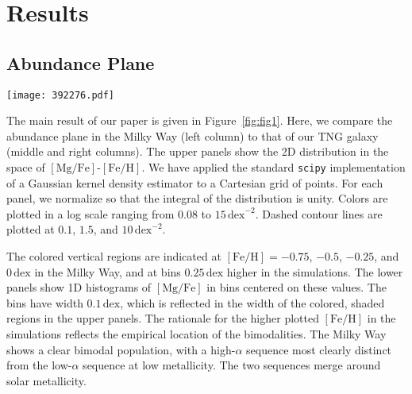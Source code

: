\documentclass[twocolumn]{aastex631}
\newcommand{\Gyr}{\ensuremath{\textrm{Gyr}}}
\newcommand{\FeH}{\ensuremath{[\textrm{Fe}/\textrm{H}]}}
\newcommand{\MgFe}{\ensuremath{[\textrm{Mg}/\textrm{Fe}]}}
\newcommand{\dex}{\ensuremath{\textrm{dex}}}
\begin{document}
\section{Results}\label{sec:results}
\subsection{Abundance Plane}\label{ssec:plane}

\begin{figure*}
  \centering
  \texttt{[image: 392276.pdf]}
  \caption{\textbf{When old stars are $\alpha$-enhanced, our galaxy from TNG displays a prominent bimodality.} The upper left panel shows the distribution in the \MgFe{}-\FeH{} plane of the Milky Way, demonstrating a clear bimodality (data selection given in text). The lower left panel shows the 1D histograms of \MgFe{} at fixed \FeH{} values of $-0.5$, $-0.25$, $0$, and $0.25$ (blue, orange, green, and red, respectively). In the Milky Way, the bimodality is strongest at low metallicities while disappearing at high metallicities. The middle column shows the same plots but for our TNG galaxy (392276) and with the fixed \FeH{} values $0.25\,\dex$ lower. Only faint structure is seen in the lowest bin (blue, $-0.75\,\dex$). The right column shows the same subhalo but after increasing the \MgFe{} value of star particles formed before $z=1.5$ linearly with formation time (with a slope of $0.1\dex/\Gyr$). A clear bimodality is shown in these panels which, unlike in the Milky Way, is present at all metallicities.}
  \label{fig:fig1}
\end{figure*}

The main result of our paper is given in Figure~\ref{fig:fig1}. Here, we compare the abundance plane in the Milky Way (left column) to that of our TNG galaxy (middle and right columns). The upper panels show the 2D distribution in the space of \MgFe{}-\FeH{}. We have applied the standard \texttt{scipy} implementation of a Gaussian kernel density estimator to a Cartesian grid of points. For each panel, we normalize so that the integral of the distribution is unity. Colors are plotted in a log scale ranging from $0.08$ to $15\,\dex^{-2}$. Dashed contour lines are plotted at $0.1$, $1.5$, and $10\,\dex^{-2}$.

The colored vertical regions are indicated at $\FeH=-0.75$, $-0.5$, $-0.25$, and $0\,\dex$ in the Milky Way, and at bins $0.25\,\dex$ higher in the simulations. The lower panels show 1D histograms of \MgFe{} in bins centered on these values. The bins have width $0.1\,\dex$, which is reflected in the width of the colored, shaded regions in the upper panels. The rationale for the higher plotted \FeH{} in the simulations reflects the empirical location of the bimodalities. The Milky Way shows a clear bimodal population, with a high-$\alpha$ sequence most clearly distinct from the low-$\alpha$ sequence at low metallicity. The two sequences merge around solar metallicity.
\end{document}

